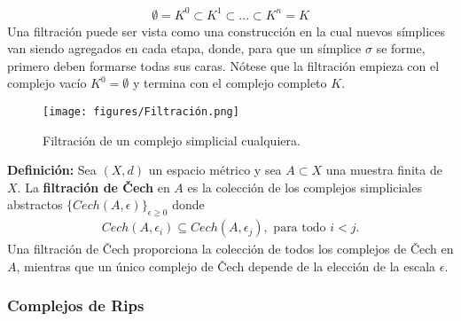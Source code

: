 \documentclass[a4paper,11pt]{article}
\begin{document}
\begin{align*}
    \emptyset = K^{0}\subset K^{1}\subset ... \subset K^{n}=K
\end{align*}
Una filtración puede ser vista como una construcción en la cual nuevos símplices van siendo agregados en cada etapa, donde, para que un símplice $\sigma$ se forme, primero deben formarse todas sus caras. Nótese que la filtración empieza con el complejo vacío $K^{0}=\emptyset$ y termina con el complejo completo $K$.
\begin{figure}[!htb]
  \centering
  \texttt{[image: figures/Filtración.png]}
  \caption{Filtración de un complejo simplicial cualquiera.}
\end{figure}
\textbf{Definición:} Sea $(X, d)$ un espacio métrico y sea $A \subset X$ una muestra finita de $X$. La \textbf{filtración de Čech} en $A$ es la colección de los complejos simpliciales abstractos $\{Cech(A,\epsilon)\}_{\epsilon \geq 0}$ donde
\begin{align*}
    Cech(A,\epsilon_{i}) \subseteq Cech(A,\epsilon_{j}), \text{ para todo } i < j.
\end{align*}
Una filtración de Čech proporciona la colección de todos los complejos de Čech en $A$, mientras que un único complejo de Čech depende de la elección de la escala $\epsilon$.





\subsubsection*{Complejos de Rips}
\end{document}

